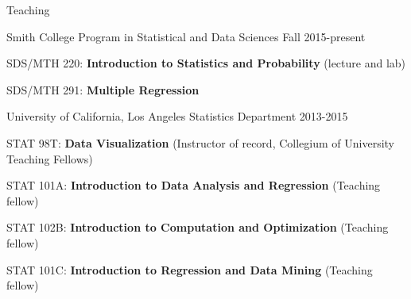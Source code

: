 \documentclass{resume} %
\begin{document}
\begin{rSection}{Teaching}

\begin{rSubsection}{Smith College }{ Program in Statistical and Data Sciences }{Fall 2015-present}{}
\item SDS/MTH 220: \textbf{Introduction to Statistics and Probability} (lecture and lab)
\item SDS/MTH 291: \textbf{Multiple Regression}
\end{rSubsection}


\begin{rSubsection}{University of California, Los Angeles }{ Statistics Department }{2013-2015}{}
\item STAT 98T: \textbf{Data Visualization }(Instructor of record, Collegium of University Teaching Fellows)
 \item STAT 101A: \textbf{Introduction to Data Analysis and Regression} (Teaching fellow)
\item STAT 102B: \textbf{Introduction to Computation and Optimization} (Teaching fellow)
\item  STAT 101C: \textbf{Introduction to Regression and Data Mining} (Teaching fellow)
\end{rSubsection}


\end{rSection}
\end{document}
